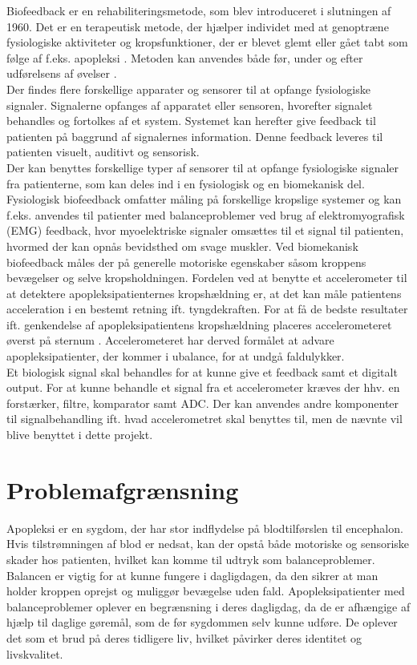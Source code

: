 Biofeedback  er en rehabiliteringsmetode, som blev introduceret i slutningen af 1960\cite{Glanz1995,Prentice2007}. Det er en terapeutisk metode, der hjælper individet med at genoptræne fysiologiske aktiviteter og kropsfunktioner, der er blevet glemt eller gået tabt som følge af f.eks. apopleksi \cite{Prentice2007}. Metoden kan anvendes både før, under og efter udførelsens af øvelser \cite{Prentice2007, Giggins2013}. \\
Der findes flere forskellige apparater og sensorer til at opfange fysiologiske signaler. Signalerne opfanges af apparatet eller sensoren, hvorefter signalet behandles og fortolkes af et system. Systemet kan herefter give feedback til patienten på baggrund af signalernes information. \cite{Prentice2007} Denne feedback leveres til patienten visuelt, auditivt og sensorisk.\\
Der kan benyttes forskellige typer af sensorer til at opfange fysiologiske signaler fra patienterne, som kan deles ind i en fysiologisk og en biomekanisk del. \cite{Giggins2013} Fysiologisk biofeedback omfatter måling på forskellige kropslige systemer og kan f.eks. anvendes til patienter med balanceproblemer ved brug af elektromyografisk (EMG) feedback, hvor myoelektriske signaler omsættes til et signal til patienten, hvormed der kan opnås bevidsthed om svage muskler. Ved biomekanisk biofeedback måles der på generelle motoriske egenskaber såsom kroppens bevægelser og selve kropsholdningen.\cite{Giggins2013} Fordelen ved at benytte et accelerometer til at detektere apopleksipatienternes kropshældning er, at det kan måle patientens acceleration i en bestemt retning ift. tyngdekraften. For at få de bedste resultater ift. genkendelse af apopleksipatientens kropshældning placeres accelerometeret øverst på sternum \cite{Gjoreski2011}. Accelerometeret har derved formålet at advare apopleksipatienter, der kommer i ubalance, for at undgå faldulykker. \cite{Hjaelpemiddelbasen} \\

Et biologisk signal skal behandles for at kunne give et feedback samt et digitalt output. For at kunne behandle et signal fra et accelerometer kræves der hhv. en forstærker, filtre, komparator samt ADC. Der kan anvendes andre komponenter til signalbehandling ift. hvad accelerometret skal benyttes til, men de nævnte vil blive benyttet i dette projekt.

\section{Problemafgrænsning}
Apopleksi er en sygdom, der har stor indflydelse på blodtilførslen til encephalon. Hvis tilstrømningen af blod er nedsat, kan der opstå både motoriske og sensoriske skader hos patienten, hvilket kan komme til udtryk som balanceproblemer. Balancen er vigtig for at kunne fungere i dagligdagen, da den sikrer at man holder kroppen oprejst og muliggør bevægelse uden fald. \cite{Nichols1997} Apopleksipatienter med balanceproblemer oplever en begrænsning i deres dagligdag, da de er afhængige af hjælp til daglige gøremål, som de før sygdommen selv kunne udføre. De oplever det som et brud på deres tidligere liv, hvilket påvirker deres identitet og livskvalitet.\cite{Sundhedsstyrelsen2010}

